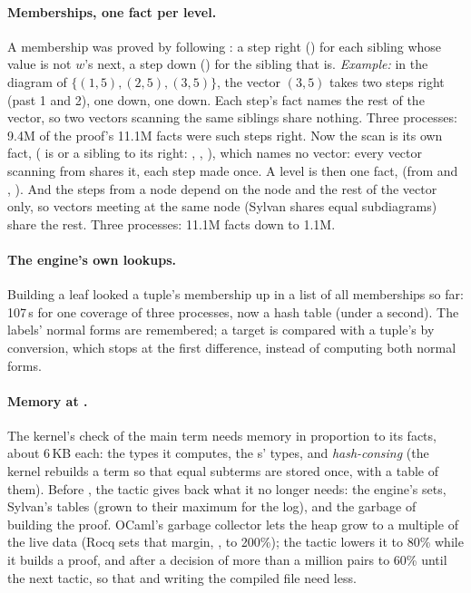 \paragraph{Memberships, one fact per level.}\label{sec:qed:fit:members}
A membership  was proved by following : a step
right () for each sibling whose value is not $w$'s next, a step
down () for the sibling that is. \emph{Example:} in the
diagram of $\{(1,5), (2,5), (3,5)\}$, the vector $(3,5)$ takes two steps
right (past 1 and 2), one down, one down. Each step's fact names the rest
of the vector, so two vectors scanning the same siblings share nothing.
Three processes: 9.4M of the proof's 11.1M facts were such steps right.
Now the scan is its own fact,  ( is  or a
sibling to its right: , ,
), which names no vector: every vector scanning
from  shares it, each step made once. A level is then one fact,
 (from  and , ). And the steps from a node depend on the node
and the rest of the vector only, so vectors meeting at the same node
(Sylvan shares equal subdiagrams) share the rest. Three processes: 11.1M
facts down to 1.1M.

\paragraph{The engine's own lookups.} Building a leaf looked a tuple's
membership up in a list of all memberships so far: 107\,s for one
coverage of three processes, now a hash table (under a second). The
labels' normal forms are remembered; a target is compared with a tuple's
by conversion, which stops at the first difference, instead of computing
both normal forms.

\paragraph{Memory at .} The kernel's check of the main term
needs memory in proportion to its facts, about 6\,KB each: the types it
computes, the s' types, and \emph{hash-consing} (the kernel
rebuilds a term so that equal subterms are stored once, with a table of
them). Before , the tactic gives
back what it no longer needs: the engine's sets, Sylvan's tables (grown
to their maximum for the log), and the garbage of building the proof.
OCaml's garbage collector lets the heap grow to a multiple of the live
data (Rocq sets that margin, , to 200\%); the tactic
lowers it to 80\% while it builds a proof, and after a decision of more
than a million pairs to 60\% until the next tactic, so that 
and writing the compiled file need less.

